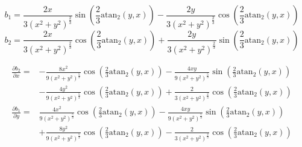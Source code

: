 \documentclass{article}
\begin{document}
$$b_1 = \frac{2x}{3\left(x^{2} + y^{2}\right)^{\frac{2}{3}}} \sin{\left (\frac{2}{3} \operatorname{atan_{2}}{\left (y,x \right )} \right )} - \frac{2y}{3\left(x^{2} + y^{2}\right)^{\frac{2}{3}}} \cos{\left (\frac{2}{3} \operatorname{atan_{2}}{\left (y,x \right )} \right )}$$
$$b_2 = \frac{2x}{3\left(x^{2} + y^{2}\right)^{\frac{2}{3}}} \cos{\left (\frac{2}{3} \operatorname{atan_{2}}{\left (y,x \right )} \right )} + \frac{2y}{3\left(x^{2} + y^{2}\right)^{\frac{2}{3}}} \sin{\left (\frac{2}{3} \operatorname{atan_{2}}{\left (y,x \right )} \right )}
$$

\begin{align*} \nonumber
\frac{\partial b_2}{\partial x}=&- \frac{8 x^{2}}{9\left(x^{2} + y^{2}\right)^{\frac{5}{3}}} \cos{\left (\frac{2}{3} \operatorname{atan_{2}}{\left (y,x \right )} \right )} - \frac{ 4x y}{9\left(x^{2} + y^{2}\right)^{\frac{5}{3}}} \sin{\left (\frac{2}{3} \operatorname{atan_{2}}{\left (y,x \right )} \right )} \\ &- \frac{ 4y^{2}}{9\left(x^{2} + y^{2}\right)^{\frac{5}{3}}} \cos{\left (\frac{2}{3} \operatorname{atan_{2}}{\left (y,x \right )} \right )} + \frac{2}{3\left(x^{2} + y^{2}\right)^{\frac{2}{3}}} \cos{\left (\frac{2}{3} \operatorname{atan_{2}}{\left (y,x \right )} \right )}\\
\frac{\partial b_1}{\partial y}=&\frac{ 4x^{2}}{9\left(x^{2} + y^{2}\right)^{\frac{5}{3}}} \cos{\left (\frac{2}{3} \operatorname{atan_{2}}{\left (y,x \right )} \right )} - \frac{ 4x y}{9\left(x^{2} + y^{2}\right)^{\frac{5}{3}}} \sin{\left (\frac{2}{3} \operatorname{atan_{2}}{\left (y,x \right )} \right )} \\&+ \frac{8 y^{2}}{9\left(x^{2} + y^{2}\right)^{\frac{5}{3}}} \cos{\left (\frac{2}{3} \operatorname{atan_{2}}{\left (y,x \right )} \right )} - \frac{2}{3\left(x^{2} + y^{2}\right)^{\frac{2}{3}}} \cos{\left (\frac{2}{3} \operatorname{atan_{2}}{\left (y,x \right )} \right )}
\end{align*}
\end{document}

